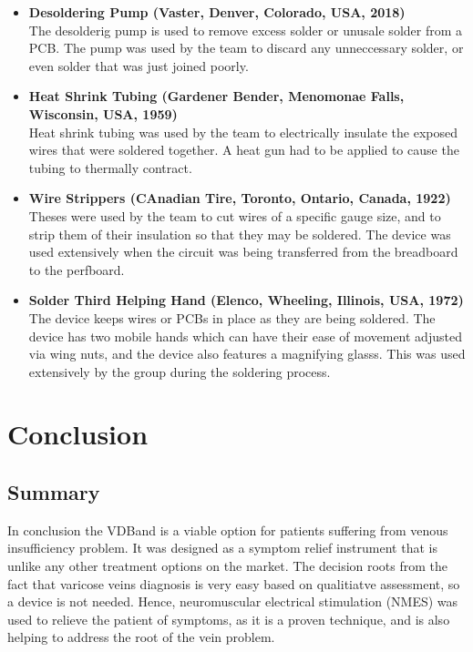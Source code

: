 \documentclass[11.5pt]{article}
\begin{document}
\begin{itemize}
\item \textbf{Desoldering Pump (Vaster, Denver, Colorado, USA, 2018)}\\
The desolderig pump is used to remove excess solder or unusale solder from a PCB. The pump was used by the team to discard any unneccessary solder, or even solder that was just joined poorly.

\item \textbf{Heat Shrink Tubing (Gardener Bender, Menomonae Falls, Wisconsin, USA, 1959)}\\
Heat shrink tubing was used by the team to electrically insulate the exposed wires that were soldered together. A heat gun had to be applied to cause the tubing to thermally contract. 

\item \textbf{Wire Strippers (CAnadian Tire, Toronto, Ontario, Canada, 1922)}\\
Theses were used by the team to cut wires of a specific gauge size, and to strip them of their insulation so that they may be soldered. The device was used extensively when the circuit was being transferred from the breadboard to the perfboard.

\item \textbf{Solder Third Helping Hand (Elenco, Wheeling, Illinois, USA, 1972)}\\
The device keeps wires or PCBs in place as they are being soldered. The device has two mobile hands which can have their ease of movement adjusted via wing nuts, and the device also features a magnifying glasss. This was used extensively by the group during the soldering process. 


\end{itemize}




\section{Conclusion}
\subsection{Summary}
In conclusion the VDBand is a viable option for patients suffering from venous insufficiency problem. It was designed as a symptom relief instrument that is unlike any other treatment options on the market. The decision roots from the fact that varicose veins diagnosis is very easy based on qualitiatve assessment, so a device is not needed. Hence, neuromuscular electrical stimulation (NMES) was used to relieve the patient of symptoms, as it is a proven technique, and is also helping to address the root of the vein problem. \\
\end{document}
